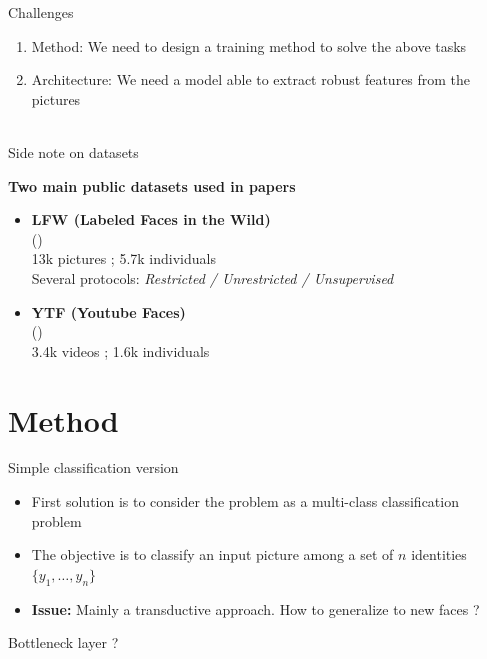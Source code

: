 \documentclass{beamer}
\begin{document}
\begin{frame}{Challenges}

{\Large
\begin{enumerate}
    \item \textcolor{cBlue}{Method}: We need to design a training method to solve the above tasks
    \item  \textcolor{cBlue}{Architecture}: We need a model able to extract robust features from the pictures~\\~\\
\end{enumerate}
}

\end{frame}

\begin{frame}{Side note on datasets}

\textbf{Two main public datasets used in papers}
\begin{itemize}
    \item \textbf{LFW (Labeled Faces in the Wild)}~\\
        (\cite{huang2008labeled})~\\
        13k pictures ; 5.7k individuals~\\
        Several protocols: \textit{Restricted / Unrestricted / Unsupervised}
    \item \textbf{YTF (Youtube Faces)}~\\
    (\cite{wolf2011face})~\\
    3.4k videos ; 1.6k individuals
\end{itemize}
\end{frame}

\section{Method}

\begin{frame}{Simple classification version}
    \begin{itemize}
        \item First solution is to consider the problem as a multi-class classification problem
        \item The objective is to classify an input picture among a set of $n$ identities $\{ y_1, \dots, y_n \}$
        \item \textbf{Issue:} Mainly a transductive approach. How to generalize to new faces ?
    \end{itemize}
    
    Bottleneck layer ?
    \cite{taigman2014deepface, sun2015deeply}
\end{frame}
\end{document}
